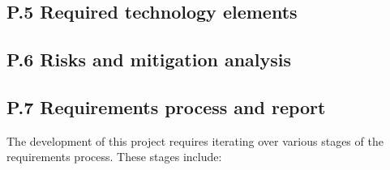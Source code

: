 \documentclass[12pt]{article}
\theoremstyle{definition}
\begin{document}
\subsection{P.5 Required technology elements}

\subsection{P.6 Risks and mitigation analysis}

\subsection{P.7 Requirements process and report}
The development of this project requires iterating over various stages of the
requirements process. These stages include:
\end{document}

